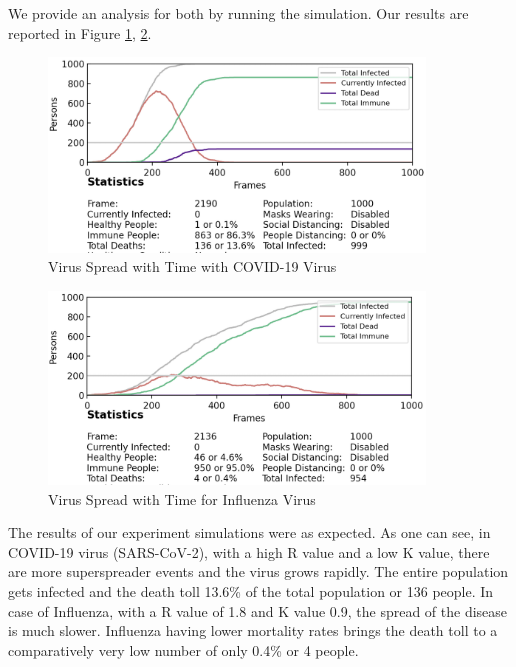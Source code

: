 \documentclass[11pt]{article}
\begin{document}
We provide an analysis for both by running the simulation. Our results are reported in Figure \ref{covid-analysis}, \ref{influenza-analysis}. 

\begin{figure}[H]
    \centering
    \includegraphics[width=10cm]{figures/covid-analysis.png}
    \caption{Virus Spread with Time with COVID-19 Virus}
    \label{covid-analysis}
\end{figure}

\begin{figure}[H]
    \centering
    \includegraphics[width=10cm]{figures/influenza-analysis.png}
    \caption{Virus Spread with Time for Influenza Virus}
    \label{influenza-analysis}
\end{figure}

The results of our experiment simulations were as expected. As one can see, in COVID-19 virus (SARS-CoV-2), with a high R value and a low K value, there are more superspreader events and the virus grows rapidly. The entire population gets infected and the death toll 13.6\% of the total population or 136 people. In case of Influenza, with a R value of 1.8 and K value 0.9, the spread of the disease is much slower. Influenza having lower mortality rates brings the death toll to a comparatively very low number of only 0.4\% or 4 people.
\end{document}
